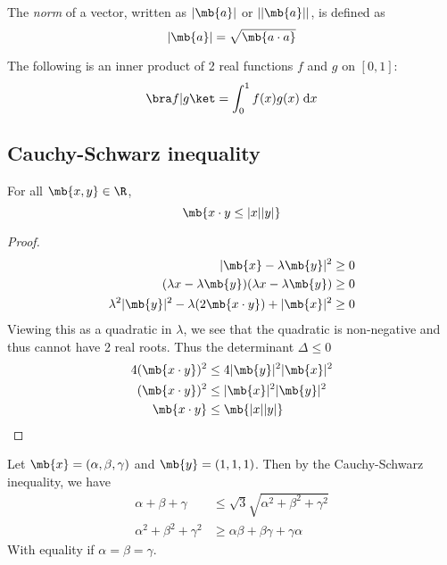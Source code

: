 \documentclass[a4paper]{article}
\begin{document}
\begin{defi}
  The \emph{norm} of a vector, written as $|\mb{a}|$ or $||\mb{a}||$, is defined as
  \[
  |\mb{a}| = \sqrt{\mb{a\cdot a}}
  \]
\end{defi}

\begin{eg}
  The following is an inner product of 2 real functions $f$ and $g$ on $[0, 1]$:
  \[
  \bra f|g\ket = \int_0^1f(x)g(x)\;\mathrm{d} x
  \]
\end{eg}

\subsection{Cauchy-Schwarz inequality}
\begin{thm}
  For all $\mb{x, y}\in \R$,
  \[
  \mb{x\cdot y \leq |x||y|}
  \]
\end{thm}

\begin{proof}
  \begin{align*}
    |\mb{x} - \lambda\mb{y}|^2 \geq 0\\
    (\lambda{x} - \lambda\mb{y})(\lambda{x} - \lambda\mb{y}) \geq 0\\
    \lambda^2 |\mb{y}|^2 - \lambda (2\mb{x\cdot y}) + |\mb{x}|^2 \geq 0
  \end{align*}
  Viewing this as a quadratic in $\lambda$, we see that the quadratic is non-negative and thus cannot have 2 real roots. Thus the determinant $\Delta \leq 0$
  \begin{align*}
    4(\mb{x\cdot y})^2 &\leq 4|\mb{y}|^2|\mb{x}|^2\\
    (\mb{x\cdot y})^2 &\leq |\mb{x}|^2|\mb{y}|^2\\
    \mb{x\cdot y} &\leq \mb{|x||y|}
  \end{align*}
\end{proof}

\begin{eg}
  Let $\mb{x} = (\alpha, \beta, \gamma)$ and $\mb{y} = (1, 1, 1)$. Then by the Cauchy-Schwarz inequality, we have
  \begin{align*}
    \alpha + \beta + \gamma &\leq \sqrt{3}\sqrt{\alpha^2 + \beta^2 + \gamma^2}\\
    \alpha^2 + \beta^2 + \gamma^2 &\geq \alpha\beta + \beta\gamma + \gamma\alpha
  \end{align*}
  With equality if $\alpha = \beta = \gamma$.
\end{eg}
\end{document}

